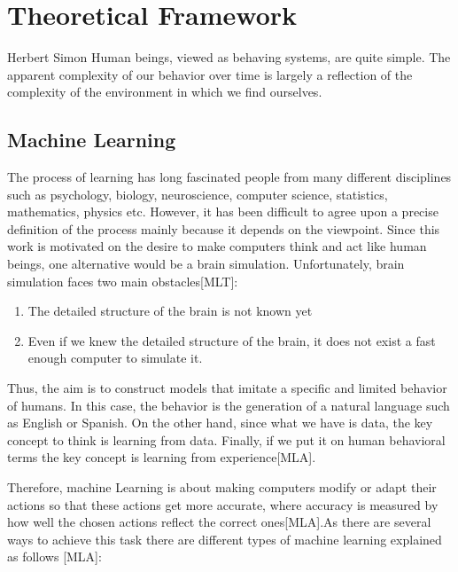 \chapter{Theoretical Framework}
\label{ch:teo}

\begin{chapterquote}{Herbert Simon}
Human beings, viewed as behaving systems, are quite simple.
The apparent complexity of our behavior over time is largely a
reflection of the complexity of the environment in which we find
ourselves.
\end{chapterquote}


\section{Machine Learning}

The process of learning has long fascinated people from many different disciplines such as psychology, biology, neuroscience, computer science, statistics, mathematics, physics etc. However, it has been difficult to agree upon a precise definition of the process mainly because it depends on the viewpoint. Since this work is motivated on the desire to make computers think and act like human beings, one alternative would be a brain simulation. Unfortunately, brain simulation faces two main obstacles[MLT]:
\begin{enumerate}
\item  The detailed structure of the brain is not known yet
\item Even if we knew the detailed structure of the brain, it does not exist a fast enough computer to simulate it.
\end{enumerate}

Thus, the aim is to construct models that imitate a specific and limited behavior of humans. In this case, the behavior is the generation of a natural language such as English or Spanish. On the other hand, since what we have is data, the key concept to think is learning from data. Finally, if we put it on human behavioral terms the key concept is learning from experience[MLA]. 

Therefore, machine Learning is about making computers modify or adapt their actions so that these actions get more accurate, where accuracy is measured by how well the chosen actions reflect the correct ones[MLA].As there are several ways to achieve this task there are different types of machine learning explained as follows [MLA]:

